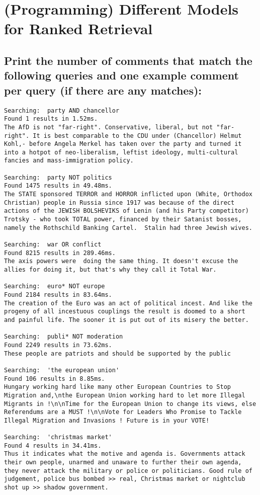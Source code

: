\documentclass{scrartcl}
\begin{document}
\section{(Programming)  Different Models for Ranked Retrieval
}

\subsection{Print the number of comments that match the following queries and one example comment
	per query (if there are any matches):}

\begin{lstlisting}
Searching:  party AND chancellor
Found 1 results in 1.52ms.
The AfD is not "far-right". Conservative, liberal, but not "far-right". It is best comparable to the CDU under (Chancellor) Helmut Kohl,- before Angela Merkel has taken over the party and turned it into a hotpot of neo-liberalism, leftist ideology, multi-cultural fancies and mass-immigration policy.

Searching:  party NOT politics
Found 1475 results in 49.48ms.
The STATE sponsored TERROR and HORROR inflicted upon (White, Orthodox Christian) people in Russia since 1917 was because of the direct actions of the JEWISH BOLSHEVIKS of Lenin (and his Party competitor) Trotsky - who took TOTAL power, financed by their Satanist bosses, namely the Rothschild Banking Cartel.  Stalin had three Jewish wives.

Searching:  war OR conflict
Found 8215 results in 289.46ms.
The axis powers were  doing the same thing. It doesn't excuse the allies for doing it, but that's why they call it Total War.

Searching:  euro* NOT europe
Found 2184 results in 83.64ms.
The creation of the Euro was an act of political incest. And like the progeny of all incestuous couplings the result is doomed to a short and painful life. The sooner it is put out of its misery the better.

Searching:  publi* NOT moderation
Found 2249 results in 73.62ms.
These people are patriots and should be supported by the public

Searching:  'the european union'
Found 106 results in 8.85ms.
Hungary working hard like many other European Countries to Stop Migration and,\nthe European Union working hard to let more Illegal Migrants in !\n\nTime for the European Union to change its views, else Referendums are a MUST !\n\nVote for Leaders Who Promise to Tackle Illegal Migration and Invasions ! Future is in your VOTE!

Searching:  'christmas market'
Found 4 results in 34.41ms.
Thus it indicates what the motive and agenda is. Governments attack their own people, unarmed and unaware to further their own agenda, they never attack the military or police or politicians. Good rule of judgement, police bus bombed >> real, Christmas market or nightclub shot up >> shadow government.

\end{lstlisting}
\end{document}
